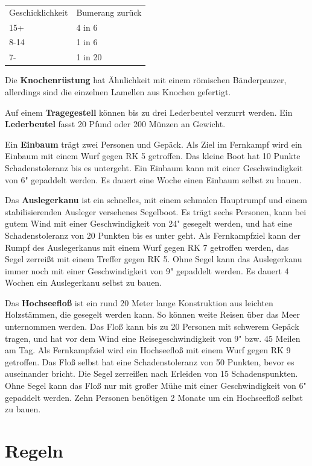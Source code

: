 \documentclass[11pt]{wbzine}
\begin{document}
\begin{multicols}{2}
\begin{tabularx}{\columnwidth}{lZ}
    Geschicklichkeit & Bumerang zurück \\
    15+ & 4 in 6 \\
    8-14 & 1 in 6 \\
    7- & 1 in 20 \\
\end{tabularx}

Die \textbf{Knochenrüstung} hat Ähnlichkeit mit einem römischen
Bänderpanzer, allerdings sind die einzelnen Lamellen aus Knochen
gefertigt.

Auf einem \textbf{Tragegestell} können bis zu drei Lederbeutel
verzurrt werden. Ein \textbf{Lederbeutel} fasst 20 Pfund oder 200
Münzen an Gewicht.

Ein \textbf{Einbaum} trägt zwei Personen und Gepäck. Als Ziel im
Fernkampf wird ein Einbaum mit einem Wurf gegen RK 5 getroffen. Das
kleine Boot hat 10 Punkte Schadenstoleranz bis es untergeht. Ein
Einbaum kann mit einer Geschwindigkeit von 6" gepaddelt werden. Es
dauert eine Woche einen Einbaum selbst zu bauen.

Das \textbf{Auslegerkanu} ist ein schnelles, mit einem schmalen
Hauptrumpf und einem stabilisierenden Ausleger versehenes Segelboot.
Es trägt sechs Personen, kann bei gutem Wind mit einer
Geschwindigkeit von 24" gesegelt werden, und hat eine
Schadenstoleranz von 20 Punkten bis es unter geht. Als Fernkampfziel
kann der Rumpf des Auslegerkanus mit einem Wurf gegen RK 7 getroffen
werden, das Segel zerreißt mit einem Treffer gegen RK 5. Ohne Segel
kann das Auslegerkanu immer noch mit einer Geschwindigkeit von 9"
gepaddelt werden. Es dauert 4 Wochen ein Auslegerkanu selbst zu
bauen.

Das \textbf{Hochseefloß} ist ein rund 20 Meter lange Konstruktion
aus leichten Holzstämmen, die gesegelt werden kann.  So können weite
Reisen über das Meer unternommen werden. Das Floß kann bis zu 
20 Personen mit schwerem Gepäck tragen, und hat vor dem Wind eine
Reisegeschwindigkeit von 9" bzw. 45 Meilen am Tag. Als Fernkampfziel
wird ein Hochseefloß mit einem Wurf gegen RK 9 getroffen. Das Floß
selbst hat eine Schadenstoleranz von 50 Punkten, bevor es
auseinander bricht. Die Segel zerreißen nach Erleiden von 15
Schadenspunkten. Ohne Segel kann das Floß nur mit großer Mühe mit
einer Geschwindigkeit von 6" gepaddelt werden. Zehn Personen
benötigen 2 Monate um ein Hochseefloß selbst zu bauen.


\section{Regeln}


\end{multicols}
\end{document}
